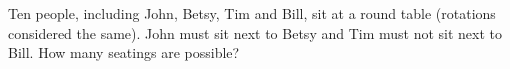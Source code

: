 Ten people, including John, Betsy, Tim and Bill, sit at a round table (rotations considered the same). John must sit next to Betsy and Tim must not sit next to Bill. How many seatings are possible?

